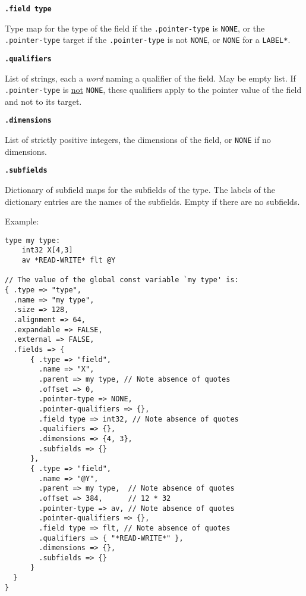 \documentclass[12pt]{article}
\newcommand{\ttkey}[1]{{\tt \bfseries #1}}
\newenvironment{indpar}[1][0.3in]%
	{\begin{list}{}%
		     {\setlength{\itemsep}{0in}%
		      \setlength{\topsep}{0in}%
		      \setlength{\parsep}{1ex}%
		      \setlength{\labelwidth}{#1}%
		      \setlength{\leftmargin}{#1}%
		      \addtolength{\leftmargin}{\labelsep}}%
	 \item}%
	{\end{list}}
\begin{document}
\ttkey{.field type}
\begin{indpar}
Type map for the type of the field if the {\tt .pointer-type}
is {\tt NONE}, or the {\tt .pointer-type} target if the
{\tt .pointer-type} is not {\tt NONE}, or {\tt NONE}
for a {\tt *LABEL*}.
\end{indpar}

\ttkey{.qualifiers}
\begin{indpar}
List of strings, each a {\em word} naming a qualifier
of the field.  May be empty list.
If {\tt .pointer-type} is \underline{not} {\tt NONE},
these qualifiers apply to the pointer value of the field
and not to its target.
\end{indpar}

\ttkey{.dimensions}
\begin{indpar}
List of strictly positive integers, the dimensions of the field, or {\tt NONE}
if no dimensions.
\end{indpar}

\ttkey{.subfields}
\begin{indpar}
Dictionary of subfield maps for the subfields of the type.  The labels
of the dictionary entries are the names of the subfields.
Empty if there are no subfields.
\end{indpar}

Example:
\begin{indpar}\begin{verbatim}
type my type:
    int32 X[4,3]
    av *READ-WRITE* flt @Y

// The value of the global const variable `my type' is:
{ .type => "type",
  .name => "my type",
  .size => 128,
  .alignment => 64,
  .expandable => FALSE,
  .external => FALSE,
  .fields => {
      { .type => "field",
        .name => "X",
        .parent => my type, // Note absence of quotes
        .offset => 0,
        .pointer-type => NONE,
        .pointer-qualifiers => {},
        .field type => int32, // Note absence of quotes
        .qualifiers => {},
        .dimensions => {4, 3},
        .subfields => {}
      },
      { .type => "field",
        .name => "@Y",
        .parent => my type,  // Note absence of quotes
        .offset => 384,      // 12 * 32
        .pointer-type => av, // Note absence of quotes
        .pointer-qualifiers => {},
        .field type => flt, // Note absence of quotes
        .qualifiers => { "*READ-WRITE*" },
        .dimensions => {},
        .subfields => {}
      }
  }
}

\end{verbatim}\end{indpar}
\end{document}
